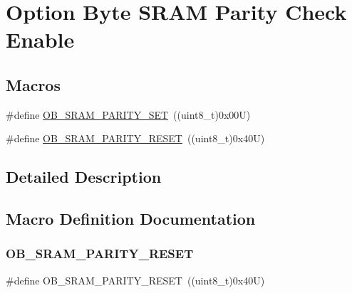 \hypertarget{group___f_l_a_s_h_ex___o_b___r_a_m___parity___check___enable}{}\section{Option Byte S\+R\+AM Parity Check Enable}
\label{group___f_l_a_s_h_ex___o_b___r_a_m___parity___check___enable}
\subsection*{Macros}
\begin{DoxyCompactItemize}
\item 
\#define \hyperlink{group___f_l_a_s_h_ex___o_b___r_a_m___parity___check___enable_gab108dcd65836f802216f11c238450cd6}{O\+B\+\_\+\+S\+R\+A\+M\+\_\+\+P\+A\+R\+I\+T\+Y\+\_\+\+S\+ET}~((uint8\+\_\+t)0x00\+U)
\item 
\#define \hyperlink{group___f_l_a_s_h_ex___o_b___r_a_m___parity___check___enable_gab408447c5e7a9bd087e9346cc3b3021b}{O\+B\+\_\+\+S\+R\+A\+M\+\_\+\+P\+A\+R\+I\+T\+Y\+\_\+\+R\+E\+S\+ET}~((uint8\+\_\+t)0x40\+U)
\end{DoxyCompactItemize}


\subsection{Detailed Description}


\subsection{Macro Definition Documentation}
\mbox{\label{group___f_l_a_s_h_ex___o_b___r_a_m___parity___check___enable_gab408447c5e7a9bd087e9346cc3b3021b}} 
\subsubsection{\texorpdfstring{O\+B\+\_\+\+S\+R\+A\+M\+\_\+\+P\+A\+R\+I\+T\+Y\+\_\+\+R\+E\+S\+ET}{OB\_SRAM\_PARITY\_RESET}}
{\footnotesize\ttfamily \#define O\+B\+\_\+\+S\+R\+A\+M\+\_\+\+P\+A\+R\+I\+T\+Y\+\_\+\+R\+E\+S\+ET~((uint8\+\_\+t)0x40\+U)}

